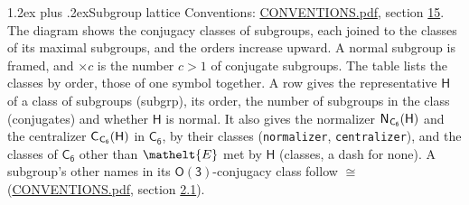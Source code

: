 \documentclass[10pt,a4paper]{article}
\makeatletter
\renewcommand\section{\@startsection{section}{1}{\z@}{-3ex plus -1ex minus -.2ex}%
  {1.2ex plus .2ex}{\normalfont\large\sffamily\bfseries\color{parttitle}}}
\numberwithin{equation}{section}
\newcommand{\eltfont}[1]{{\let\sigma\eltsigma\mathelt{#1}}}
\newcommand{\grp}[1]{\mathsf{#1}}
\newcommand{\cls}[1]{\eltfont{#1}}
\newcommand{\samecls}{\cong}
\newcommand{\hairsp}{\mkern1mu}
\makeatother
\begin{document}
\section{Subgroup lattice}\label{s:subgroups}
Conventions: \href{../../CONVENTIONS.pdf}{CONVENTIONS.pdf}, section \href{../../CONVENTIONS.pdf\#conv.15}{15}.
The diagram shows the conjugacy classes of subgroups, each joined to the classes of its maximal subgroups, and the orders increase upward. \label{n:index.conjugates.c}A normal subgroup is framed, and ${\times}c$ is the number $c > 1$ of conjugate subgroups. The table lists the classes by order, those of one symbol together. \label{n:group.H}\label{n:head.subgroup}\label{n:head.order}\label{n:head.conjugates}\label{n:head.normal}A row gives the representative $\grp{H}$ of a class of subgroups (subgrp), its order, the number of subgroups in the class (conjugates) and whether $\grp{H}$ is normal. \label{n:group.normalizer}\label{n:group.centralizer}\label{n:head.classes}It also gives the normalizer $\grp{N}_{\hairsp \grp{C_{6}}}(\grp{H})$ and the centralizer $\grp{C}_{\hairsp \grp{C_{6}}}(\grp{H})$ in $\grp{C_{6}}$, by their classes (\texttt{normalizer}, \texttt{centralizer}), and the classes of $\grp{C_{6}}$ other than $\cls{E}$ met by $\grp{H}$ (classes, a dash for none). A subgroup's other names in its \href{O3.pdf}{$\grp{O(3)}$}-conjugacy class follow $\samecls$ (\href{../../CONVENTIONS.pdf}{CONVENTIONS.pdf}, section \href{../../CONVENTIONS.pdf\#conv.2.1}{2.1}).
\begin{center}
\end{center}
\end{document}
